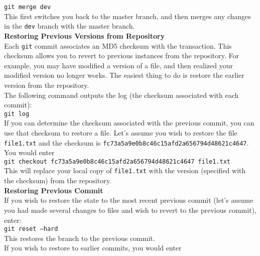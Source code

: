 \documentclass[12pt]{article}
\begin{document}
{\tt git merge dev} \\

\noindent
This first switches you back to the master branch, and then merges any changes in the {\tt dev} branch with the master branch. \\


\noindent
{\bf Restoring Previous Versions from Repository} \\

\noindent
Each {\tt git} commit associates an {\small MD5} checksum with the transaction. This checksum allows you to revert to previous instances from the repository. For example, you may have modified a version of a file, and then realized your modified version no longer works. The easiest thing to do is restore the earlier version from the repository. \\

\noindent
The following command outputs the log (the checksum associated with each commit): \\

{\tt git log} \\

\noindent
If you can determine the checksum associated with the previous commit, you can use that checksum to restore a file. Let's assume you wish to restore the file {\tt file1.txt} and the checksum is {\tt  fc73a5a9e0b8c46c15afd2a656794d48621c4647}. You would enter \\

{\tt git checkout fc73a5a9e0b8c46c15afd2a656794d48621c4647 file1.txt} \\

\noindent
This will replace your local copy of {\tt file1.txt} with the version (specified with the checksum) from the repository. \\

\noindent
{\bf Restoring Previous Commit}\\

\noindent
If you wish to restore the state to the most recent previous commit (let's assume you had made several changes to files and wish to revert to the previous commit), enter: \\

{\tt git reset --hard}\\

\noindent
This restores the branch to the previous commit. \\

\noindent
If you wish to restore to earlier commits, you would enter \\
\end{document}
